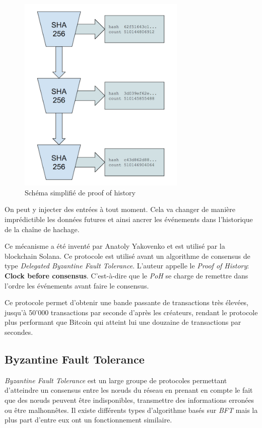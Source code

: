 \begin{figure}[H]
    \centering
    \includegraphics[width=8cm]{images/solana}
    \caption{Schéma simplifié de proof of history}
\end{figure}

On peut y injecter des entrées à tout moment. Cela va changer de manière imprédictible les données futures et ainsi ancrer les événements dans l'historique de la chaîne de hachage.

Ce mécanisme a été inventé par Anatoly Yakovenko et est utilisé par la blockchain Solana. Ce protocole est utilisé avant un algorithme de consensus de type \emph{Delegated Byzantine Fault Tolerance}. L'auteur appelle le \emph{Proof of History}: \textbf{Clock before consensus}. C'est-à-dire que le \emph{PoH} se charge de remettre dans l'ordre les événements avant faire le consensus.

Ce protocole permet d'obtenir une bande passante de transactions très élevées, jusqu'à 50'000 transactions par seconde d'après les créateurs, rendant le protocole plus performant que Bitcoin qui atteint lui une douzaine de transactions par secondes.

\subsection{Byzantine Fault Tolerance}

\emph{Byzantine Fault Tolerance} est un large groupe de protocoles permettant d'atteindre un consensus entre les nœuds du réseau en prenant en compte le fait que des nœuds peuvent être indisponibles, transmettre des informations erronées ou être malhonnêtes. Il existe différents types d'algorithme basés sur \emph{BFT} mais la plus part d'entre eux ont un fonctionnement similaire. 


